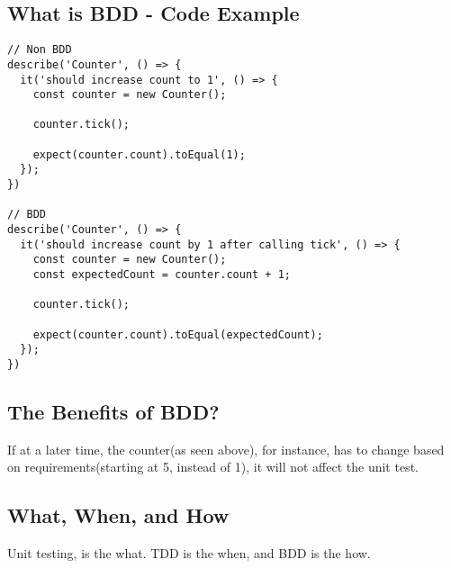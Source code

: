 \subsection{What is BDD - Code Example}
\begin{lstlisting}
// Non BDD
describe('Counter', () => {
  it('should increase count to 1', () => {
    const counter = new Counter();

    counter.tick();

    expect(counter.count).toEqual(1);
  });
})

// BDD
describe('Counter', () => {
  it('should increase count by 1 after calling tick', () => {
    const counter = new Counter();
    const expectedCount = counter.count + 1;

    counter.tick();

    expect(counter.count).toEqual(expectedCount);
  });
})
\end{lstlisting}

\subsection{ The Benefits of BDD? }
If at a later time, the counter(as seen above), for instance, has to change
based on requirements(starting at 5, instead of 1), it will not affect the unit
test.

\subsection{What, When, and How}
Unit testing, is the what. TDD is the when, and BDD is the how.

